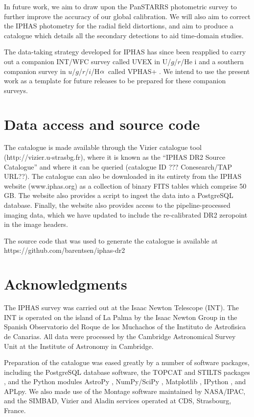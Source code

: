 \documentclass[useAMS,usenatbib]{mn2e}
\def\ha{\mbox{H$\rm \alpha$}}
\begin{document}
In future work, we aim to draw upon the PanSTARRS photometric
survey to further improve the accuracy of our global calibration.
We will also aim to correct the IPHAS photometry for the
radial field distortions,
and aim to produce a catalogue
which details all the secondary detections
to aid time-domain studies.

The data-taking strategy developed for IPHAS
has since been reapplied to carry out a companion INT/WFC survey called UVEX
in U/$g$/$r$/He {\sc i} \citep{Groot2009}
and a southern companion survey in $u$/$g$/$r$/$i$/\ha\ 
called VPHAS+ \citep{Drew2014}.
We intend to use the present work
as a template for future releases
to be prepared for these companion surveys.

\section*{Data access and source code}
\label{sec:dataaccess}

The catalogue is made available through the Vizier
catalogue tool (http://vizier.u-strasbg.fr),
where it is known as the ``IPHAS DR2 Source Catalogue''
and where it can be queried
(catalogue ID ??? Conesearch/TAP URL??).
The catalogue can also be downloaded in its entirety
from the IPHAS website (www.iphas.org) as a collection 
of binary FITS tables which comprise 50\,GB.
The website also provides a script
to ingest the data into a PostgreSQL database.
Finally, the website also provides access to the pipeline-processed
imaging data, which we have updated to include
the re-calibrated DR2 zeropoint in the image headers.

The source code that was used to generate
the catalogue is available at
https://github.com/barentsen/iphas-dr2

\section*{Acknowledgments}

The IPHAS survey was carried out 
at the Isaac Newton Telescope (INT).
The INT is operated on the island of La Palma
by the Isaac Newton Group
in the Spanish Observatorio del Roque de los Muchachos
of the Instituto de Astrofisica de Canarias.
All data were processed 
by the Cambridge Astronomical Survey Unit
at the Institute of Astronomy in Cambridge.

Preparation of the catalogue was eased greatly
by a number of software packages,
including the PostgreSQL database software,
the TOPCAT and STILTS packages \citep{Taylor2005,Taylor2006},
and the Python modules
AstroPy \citep{Astropy},
NumPy/SciPy \citep{Numpy},
Matplotlib \citep{Matplotlib},
IPython \citep{IPython},
and APLpy.
We also made use of the Montage software maintained by NASA/IPAC,
and the SIMBAD, Vizier and Aladin \citep{Aladin} services
operated at CDS, Strasbourg, France.
\end{document}
